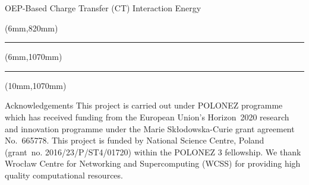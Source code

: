 \documentclass[final]{beamer} %
\begin{document}
\begin{frame}{OEP-Based Charge Transfer (CT) Interaction Energy}
\begin{textblock*}{820mm}(6mm,820mm)
\noindent\rule{83cm}{5.4pt}
\end{textblock*}


\begin{textblock*}{820mm}(6mm,1070mm)
\noindent\rule{83cm}{5.4pt}
\end{textblock*}


%
%
%
\begin{textblock*}{820mm}(10mm,1070mm)
\begin{block}{Acknowledgements}
 This project is carried out under POLONEZ programme which has received funding from the European Union's
 Horizon~2020 research and innovation programme under the Marie Sk{\l}odowska-Curie grant agreement 
 No.~665778. This project is funded by National Science Centre, Poland 
 (grant~no. 2016/23/P/ST4/01720) within the POLONEZ 3 fellowship.
 We thank
 Wroc{\l}aw Centre for Networking and Supercomputing (WCSS) for
 providing high quality computational resources.
\end{block}
\end{textblock*}
%
%
%
%
%
\end{frame}
\end{document}
